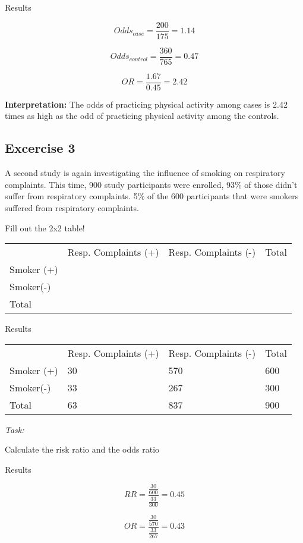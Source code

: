 \documentclass[
  14pt,
  letterpaper,
  DIV=11,
  numbers=noendperiod]{scrreprt}
\begin{document}
Results

\[
Odds_{case} = \frac{200}{175} = 1.14
\]

\[
Odds_{control} = \frac{360}{765} = 0.47
\]

\[
OR = \frac{1.67}{0.45} = 2.42
\]

\textbf{Interpretation:} The odds of practicing physical activity among
cases is 2.42 times as high as the odd of practicing physical activity
among the controls.

\subsection{Excercise 3}\label{excercise-3-1}

A second study is again investigating the influence of smoking on
respiratory complaints. This time, 900 study participants were enrolled,
93\% of those didn't suffer from respiratory complaints. 5\% of the 600
participants that were smokers suffered from respiratory complaints.

Fill out the 2x2 table!

\begin{longtable}[]{@{}llll@{}}
\toprule\noalign{}
\endhead
\bottomrule\noalign{}
\endlastfoot
& Resp. Complaints (+) & Resp. Complaints (-) & Total \\
Smoker (+) & & & \\
Smoker(-) & & & \\
Total & & & \\
\end{longtable}

Results

\begin{longtable}[]{@{}llll@{}}
\toprule\noalign{}
\endhead
\bottomrule\noalign{}
\endlastfoot
& Resp. Complaints (+) & Resp. Complaints (-) & Total \\
Smoker (+) & 30 & 570 & 600 \\
Smoker(-) & 33 & 267 & 300 \\
Total & 63 & 837 & 900 \\
\end{longtable}

\emph{Task:}

Calculate the risk ratio and the odds ratio

Results

\[
RR = \frac{\frac{30}{600}}{\frac{33}{300}} = 0.45
\]

\[
OR = \frac{\frac{30}{570}}{\frac{33}{267}} = 0.43
\]
\end{document}
